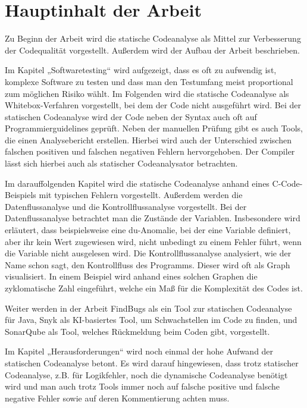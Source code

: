 \documentclass[a4paper,DIV=16]{scrartcl}
\begin{document}
\section*{Hauptinhalt der Arbeit}

Zu Beginn der Arbeit wird die statische Codeanalyse als Mittel zur Verbesserung
der Codequalität vorgestellt. Außerdem wird der Aufbau der Arbeit beschrieben.

Im Kapitel „Softwaretesting“ wird aufgezeigt, dass es oft zu aufwendig ist,
komplexe Software zu testen und dass man den Testumfang meist proportional zum
möglichen Risiko wählt. Im Folgenden wird die statische Codeanalyse als
Whitebox-Verfahren vorgestellt, bei dem der Code nicht ausgeführt wird. Bei der
statischen Codeanalyse wird der Code neben der Syntax auch oft auf
Programmierguidelines geprüft. Neben der manuellen Prüfung gibt es auch Tools,
die einen Analysebericht erstellen. Hierbei wird auch der Unterschied zwischen
falschen positiven und falschen negativen Fehlern hervorgehoben. Der Compiler
lässt sich hierbei auch als statischer Codeanalysator betrachten.

Im darauffolgenden Kapitel wird die statische Codeanalyse anhand eines
C-Code-Beispiels mit typischen Fehlern vorgestellt. Außerdem werden die
Datenflussanalyse und die Kontrollflussanalyse vorgestellt. Bei der
Datenflussanalyse betrachtet man die Zustände der Variablen. Insbesondere wird
erläutert, dass beispielsweise eine du-Anomalie, bei der eine Variable
definiert, aber ihr kein Wert zugewiesen wird, nicht unbedingt zu einem Fehler
führt, wenn die Variable nicht ausgelesen wird. Die Kontrollflussanalyse
analysiert, wie der Name schon sagt, den Kontrollfluss des Programms. Dieser
wird oft als Graph visualisiert. In einem Beispiel wird anhand eines solchen
Graphen die zyklomatische Zahl eingeführt, welche ein Maß für die Komplexität
des Codes ist.

Weiter werden in der Arbeit FindBugs als ein Tool zur statischen Codeanalyse für
Java, Snyk als KI-basiertes Tool, um Schwachstellen im Code zu finden, und
SonarQube als Tool, welches Rückmeldung beim Coden gibt, vorgestellt.

Im Kapitel „Herausforderungen“ wird noch einmal der hohe Aufwand der statischen
Codeanalyse betont. Es wird darauf hingewiesen, dass trotz statischer
Codeanalyse, z.B. für Logikfehler, noch die dynamische Codeanalyse benötigt wird
und man auch trotz Tools immer noch auf falsche positive und falsche negative
Fehler sowie auf deren Kommentierung achten muss.
\end{document}
